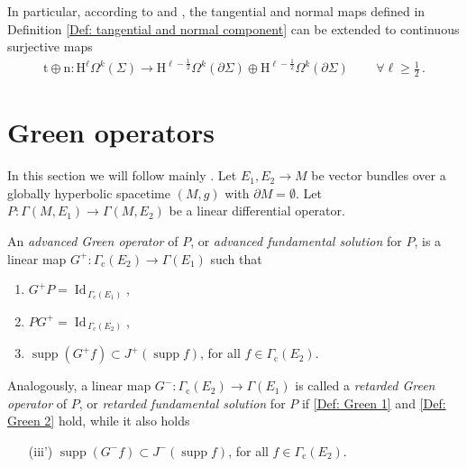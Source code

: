 \begin{remark}\label{Rmk: Sobolev tangential and normal trace maps}
	In particular, according to \cite[p. 171]{Georgescu-79} and \cite[Sec. 2]{Weck-04}, the tangential and normal maps defined in Definition \ref{Def: tangential and normal component} can be extended to continuous surjective maps
	\begin{align}\label{Eqn: Sobolev tangential and normal trace maps}
	\mathrm{t}\oplus\mathrm{n}\colon
	\mathrm{H}^\ell\Omega^k(\Sigma)\to
	\mathrm{H}^{\ell-\frac{1}{2}}\Omega^k(\partial\Sigma)\oplus
	\mathrm{H}^{\ell-\frac{1}{2}}\Omega^k(\partial\Sigma)\,\qquad\forall\ell\geq\frac{1}{2}\,.
	\end{align}
\end{remark}

\section{Green operators}\label{Sec: Green operators}
In this section we will follow mainly \cite{Baer-15}.
Let $ E_1 ,  E_2 \to M$ be vector bundles over a globally hyperbolic spacetime $(M,g)$ with $\partial M=\emptyset$. Let $P : \Gamma (M,  E_1 ) \to \Gamma (M,  E_2 )$ be a linear differential operator.

\begin{Definition}\label{Def: Green operators} An \emph{advanced Green operator} of $P$, or \emph{advanced fundamental solution} for $P$, is a linear map $G^+:\Gamma_\mathrm{c}(E_2)\to \Gamma(E_1)$ such that
	\begin{enumerate}[label=\textnormal{(\roman*)}]
		\item\label{Def: Green 1} $G^+ P=\operatorname{Id}_{\,\Gamma_\mathrm{c}(E_1)}$,
		\item\label{Def: Green 2} $P G^+=\operatorname{Id}_{\,\Gamma_\mathrm{c}(E_2)}$,
		\item $\operatorname{supp}(G^+ f)\subset J^+(\operatorname{supp}f)$, for all $f\in \Gamma_\mathrm{c}(E_2)$.
	\end{enumerate}
	Analogously, a linear map $G^-:\Gamma_\mathrm{c}(E_2)\to \Gamma(E_1)$ is called a \emph{retarded Green operator} of $P$, or \emph{retarded fundamental solution} for $P$ if \ref{Def: Green 1} and \ref{Def: Green 2} hold, while it also holds
	\begin{enumerate}
		\item[\textnormal{(iii')}] $\operatorname{supp}(G^- f)\subset J^-(\operatorname{supp}f)$, for all $f\in \Gamma_\mathrm{c}(E_2)$.
	\end{enumerate}
\end{Definition}

